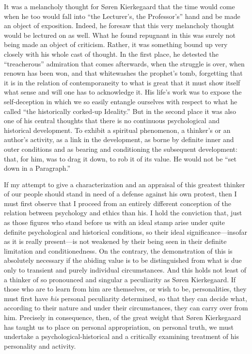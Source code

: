 \documentclass[12pt,a4paper]{book}
\newcommand{\opage}[1]{\marginnote{\footnotesize\textit{[#1]}}}
\begin{document}
It was a melancholy thought for Søren Kierkegaard that the time would
come when he too would fall into ``the Lecturer's, the Professor's''
hand and be made an object of exposition. Indeed, he foresaw that this
very melancholy thought would be lectured on as well. What he found
repugnant in this was surely not being made an object of
criticism. Rather, it was something bound up very closely with his whole
cast of thought. In the first place, he detested the ``treacherous''
admiration that comes afterwards, when the struggle is over, when renown
has been won, and that whitewashes the prophet's tomb, forgetting that
it is in the relation of contemporaneity to what is great that it must
show itself what sense and will one has to acknowledge it. His life's
work was to expose the self-deception in which we so easily entangle
ourselves with respect to what he called ``the historically corked-up
Ideality.'' But in the second place it was also one of his central
thoughts that there is no continuous psychological and historical
development. To exhibit a spiritual phenomenon, a thinker's or an
author's activity, as a link in the development, as borne by definite
inner and outer conditions and as bearing and conditioning the
subsequent development: that, for him, was to drag it down, to rob it of
its value. He would not be ``set down in a Paragraph.''

\opage{2}If my attempt to give a characterization and an appraisal of this
greatest thinker of our people should stand in need of a defense against
his own protest, then I must first observe that I proceed from an
entirely different conception of the relation between psychology and
ethics than his. I hold the conviction that, just as those figures who
stand before us with an ideal stamp arise under quite definite
psychological and historical conditions, so their ideal
significance---insofar as it is really present---is not weakened by their
being seen in their definite limitation and conditionedness. On the
contrary, the demonstration of this is absolutely necessary if the
abiding value is to be distinguished from what is due only to transient
and purely individual circumstances. And this holds not least of a
thinker of so pronounced and singular a peculiarity as Søren Kierkegaard.
If those who are to learn from him are themselves, or wish to be,
personalities, they must first have \textit{his} personal peculiarity
determined, so that they can decide what, according to their nature and
under their circumstances, they can carry over from him. Precisely in
consequence, then, of the great weight that Søren Kierkegaard has taught
us to place on personal appropriation, on personal truth, we must
undertake a psychological-historical and a critically examining treatment
of his personality and activity.
\end{document}
